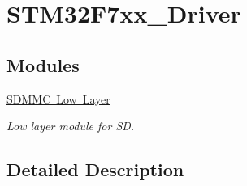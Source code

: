 \hypertarget{group___s_t_m32_f7xx___driver}{}\section{S\+T\+M32\+F7xx\+\_\+\+Driver}
\label{group___s_t_m32_f7xx___driver}
\subsection*{Modules}
\begin{DoxyCompactItemize}
\item 
\mbox{\hyperlink{group___s_d_m_m_c___l_l}{S\+D\+M\+M\+C Low Layer}}
\begin{DoxyCompactList}\small\item\em Low layer module for SD. \end{DoxyCompactList}\end{DoxyCompactItemize}


\subsection{Detailed Description}
